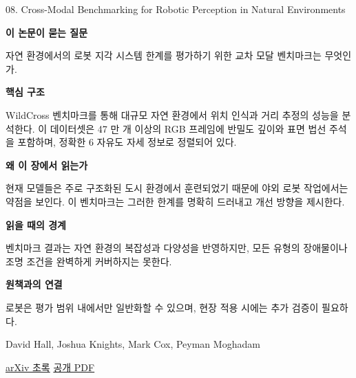 \documentclass[11pt,openany]{book}
\begin{document}
\begin{termcard}{08. Cross-Modal Benchmarking for Robotic Perception in Natural Environments}

\par

\medskip

{\sffamily\bfseries\color{deepblue} 이 논문이 묻는 질문}\par

자연 환경에서의 로봇 지각 시스템 한계를 평가하기 위한 교차 모달 벤치마크는 무엇인가.

\smallskip

{\sffamily\bfseries\color{deepblue} 핵심 구조}\par

WildCross 벤치마크를 통해 대규모 자연 환경에서 위치 인식과 거리 추정의 성능을 분석한다. 이 데이터셋은 47 만 개 이상의 RGB 프레임에 반밀도 깊이와 표면 법선 주석을 포함하며, 정확한 6 자유도 자세 정보로 정렬되어 있다.

\smallskip

{\sffamily\bfseries\color{deepblue} 왜 이 장에서 읽는가}\par

현재 모델들은 주로 구조화된 도시 환경에서 훈련되었기 때문에 야외 로봇 작업에서는 약점을 보인다. 이 벤치마크는 그러한 한계를 명확히 드러내고 개선 방향을 제시한다.

\smallskip

{\sffamily\bfseries\color{coral} 읽을 때의 경계}\par

벤치마크 결과는 자연 환경의 복잡성과 다양성을 반영하지만, 모든 유형의 장애물이나 조명 조건을 완벽하게 커버하지는 못한다.

\smallskip

{\sffamily\bfseries\color{teal} 원책과의 연결}\par

로봇은 평가 범위 내에서만 일반화할 수 있으며, 현장 적용 시에는 추가 검증이 필요하다.

\medskip

{\footnotesize\color{muted} David Hall, Joshua Knights, Mark Cox, Peyman Moghadam\par

\href{https://arxiv.org/abs/2606.11563}{arXiv 초록} \quad \href{https://arxiv.org/pdf/2606.11563}{공개 PDF}\par}

\end{termcard}
\end{document}
